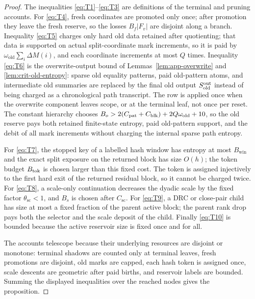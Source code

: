 \documentclass[11pt]{article}
\theoremstyle{remark}
\newcommand{\win}{\mathrm{win}}
\newcommand{\old}{\mathrm{old}}
\newcommand{\scal}{\mathrm{sc}}
\begin{document}
\begin{proof}
The inequalities \eqref{eq:T1}--\eqref{eq:T3} are definitions of the terminal and pruning accounts.  For \eqref{eq:T4}, fresh coordinates are promoted only once; after promotion they leave the fresh reserve, so the losses $B_f|F_v|$ are disjoint along a branch.  Inequality \eqref{eq:T5} charges only hard old data retained after quotienting; that data is supported on actual split-coordinate mark increments, so it is paid by $\omega_{\old}\sum_i\Delta M(i)$, and each coordinate increments at most $Q$ times.  Inequality \eqref{eq:T6} is the overwrite-output bound of Lemmas~\ref{lem:app-overwrite} and \ref{lem:crit-old-entropy}: sparse old equality patterns, paid old-pattern atoms, and intermediate old summaries are replaced by the final old output $S_{\old}^{\rm out}$ instead of being charged as a chronological path transcript.  The row is applied once when the overwrite component leaves scope, or at the terminal leaf, not once per reset.  The constant hierarchy chooses $B_o>2(C_{\rm pat}+C_{\rm blk})+2Q\omega_{\old}+10$, so the old reserve pays both retained finite-state entropy, paid old-pattern support, and the debit of all mark increments without charging the internal sparse path entropy.

For \eqref{eq:T7}, the stopped key of a labelled hash window has entropy at most $B_{\win}$ and the exact split exposure on the returned block has size $O(h)$; the token budget $B_{\rm tok}$ is chosen larger than this fixed cost.  The token is assigned injectively to the first hard exit of the returned residual block, so it cannot be charged twice.  For \eqref{eq:T8}, a scale-only continuation decreases the dyadic scale by the fixed factor $\theta_{\scal}<1$, and $B_s$ is chosen after $C_{\scal}$.  For \eqref{eq:T9}, a DRC or close-pair child has size at most a fixed fraction of the parent active block; the parent rank drop pays both the selector and the scale deposit of the child.  Finally \eqref{eq:T10} is bounded because the active reservoir size is fixed once and for all.

The accounts telescope because their underlying resources are disjoint or monotone: terminal shadows are counted only at terminal leaves, fresh promotions are disjoint, old marks are capped, each hash token is assigned once, scale descents are geometric after paid births, and reservoir labels are bounded.  Summing the displayed inequalities over the reached nodes gives the proposition.
\end{proof}
\end{document}

